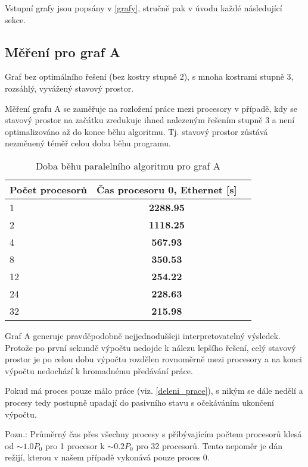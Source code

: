 \documentclass[]{article}
\begin{document}
Vstupní grafy jsou popsány v \ref{grafy}, stručně pak v úvodu každé následující sekce.

\subsection{Měření pro graf A}

Graf bez optimálního řešení (bez kostry stupně 2), s mnoha kostrami stupně 3, rozsáhlý, vyvážený stavový prostor.

Měření grafu A se zaměřuje na rozložení práce mezi procesory v případě, kdy se stavový prostor na začátku zredukuje ihned nalezeným řešením stupně 3 a není optimalizováno až do konce běhu algoritmu. Tj. stavový prostor zůstává nezměnený téměř celou dobu běhu programu.

\begin{table}[h]
\centering
\begin{tabular}{|l|c|c|}
\hline \textbf{Počet procesorů} & \textbf{Čas procesoru 0, Ethernet [s]}\\
\hline 
\hline 1 & \textbf{2288.95} \\
\hline 2 &  \textbf{1118.25} \\ 
\hline 4 &  \textbf{567.93} \\ 
\hline 8 & \textbf{350.53} \\
\hline 12 &  \textbf{254.22} \\ 
\hline 24 &  \textbf{228.63} \\ 
\hline 32 &  \textbf{215.98} \\ 
\hline 
\end{tabular}
\caption{Doba běhu paralelního algoritmu pro graf A}
\label{partestB}	
\end{table}

Graf A generuje pravděpodobně nejjednoduššeji interpretovatelný výsledek. Protože po první sekundě výpočtu nedojde k nálezu lepšího řešení, celý stavový prostor je po celou dobu výpočtu rozdělen rovnoměrně mezi procesory a na konci výpočtu nedochází k hromadnému předávání práce.

Pokud má proces pouze málo práce (viz. \ref{deleni_prace}), s nikým se dále nedělí a procesy tedy postupně upadají do pasivního stavu s očekáváním ukončení výpočtu.

Pozn.: Průměrný čas přes všechny procesy s příbývajícím počtem procesorů klesá od \(\sim 1.0P_0\) pro 1 procesor k \(\sim 0.2P_0\) pro 32 procesorů. Tento nepoměr je dán režijí, kterou v našem případě vykonává pouze proces 0.
\end{document}
